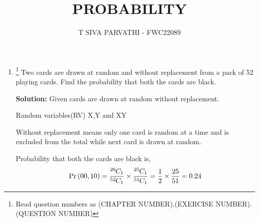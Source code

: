 \documentclass{article}
\newcommand{\solution}{\noindent \textbf{Solution: }}
\providecommand{\pr}[1]{\ensuremath{\Pr\left(#1\right)}}
\newcommand*{\permcomb}[4][0mu]{{{}^{#3}\mkern#1#2_{#4}}}
\newcommand*{\comb}[1][-1mu]{\permcomb[#1]{C}}
\begin{document}
\title{PROBABILITY}
\author{\Large T SIVA PARVATHI - FWC22089}
\date{}

\maketitle

\begin{enumerate}[label=13.\arabic{enumi}.\arabic{enumii}]%
\setcounter{enumi}{1}
\setcounter{enumii}{2}

\item \footnote{Read question numbers as (CHAPTER NUMBER).(EXERCISE NUMBER).(QUESTION NUMBER)} 
Two cards are drawn at random and without replacement from a pack of 52 playing cards. Find the probability that both the cards are black.

	\solution
	Given cards are drawn at random without replacement.
\begin{table}[h]\centering
	
	\caption{Random variables(RV) X,Y and XY}\label{table1:}
\end{table}

Without replacement means only one card is random at a time and is excluded from the total while next card is drawn at random.

Probability that both the cards are black is,
\begin{align}
\pr{00,10} =\frac{\comb{26}{1}}{\comb{52}{1}} \times \frac{\comb{25}{1}}{\comb{51}{1}} = \frac{1}{2} \times \frac{25}{51} = 0.24
\end{align}
\end{enumerate}
\end{document}
